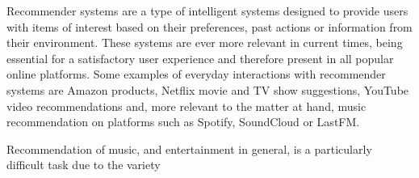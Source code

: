 Recommender systems are a type of intelligent systems designed to provide users with items of interest based on
their preferences, past actions or information from their environment. These systems are ever more relevant in
current times, being essential for a satisfactory user experience and therefore present in all popular online platforms. 
Some examples of everyday interactions with recommender systems are Amazon products, Netflix movie and TV show suggestions, YouTube video recommendations and, more relevant to the matter at hand, music recommendation on platforms such as Spotify,
SoundCloud or LastFM.

Recommendation of music, and entertainment in general, is a particularly difficult task due to the variety 